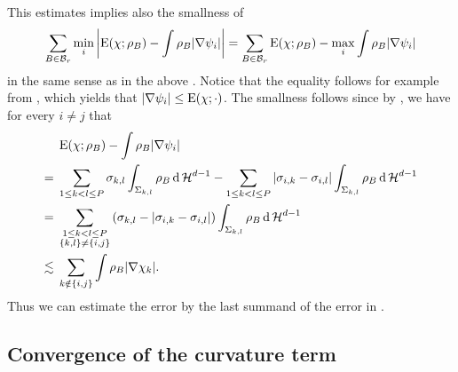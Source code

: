 \begin{remark}
	\label{localization_estimate_weaker}
This estimates implies also the smallness of
\begin{equation*}
	\sum_{ B \in \mathcal{ B }_{ r } }
		\min_{ i }
			\abs{
			\operatorname{E} ( \chi; \rho_{ B } )
			-
			\int
				\rho_{ B }
			\abs{ \nabla \psi_{ i } }
		}
	=
	\sum_{ B \in \mathcal{ B }_{ r } }
		\operatorname{E} ( \chi ; \rho_{ B } )
		-
		\max_{ i }
			\int
				\rho_{ B }
			\abs{ \nabla \psi_{ i } }
\end{equation*}
in the same sense as in the above . 
Notice that the equality follows for example from 
, which yields that $ \abs{ \nabla 
\psi_{ i } } \leq \operatorname{E} ( \chi ; \cdot )$. The smallness follows since by 
, we have for every $ i \neq j $ that
\begin{align*}
	&
	\operatorname{E} ( \chi ; \rho_{ B } ) 
	-
	\int
		\rho_{ B }
	\abs{ \nabla \psi_{ i } }
	\\
	={} &
	\sum_{ 1 \leq k < l \leq P }
		\sigma_{ k , l }
		\int_{ \Sigma_{ k , l } }
			\rho_{ B }
		\dd{ \operatorname{\mathcal{H}}^{ d -1 } }
	-
	\sum_{ 1 \leq k < l \leq P }
		\abs{ \sigma_{ i , k } - \sigma_{ i , l } }
		\int_{ \Sigma_{ k, l } }
			\rho_{ B }
		\dd{ \operatorname{\mathcal{H}}^{ d - 1 } }
	\\
	={} &
	\sum_{ \substack{1 \leq k < l \leq P \\ \{ k, l \} \neq \{ i, j \} } }
		\left(
			\sigma_{ k , l } - \abs{ \sigma_{ i , k } - \sigma_{ i , l } }
		\right)
		\int_{ \Sigma_{ k , l } }
			\rho_{ B }
		\dd{ \operatorname{\mathcal{H}}^{ d - 1 } }
	\\
	\lesssim{} &
	\sum_{ k \notin \{ i, j \} }
		\int
			\rho_{ B }
		\abs{ \nabla \chi_{ k } }.
\end{align*}
Thus we can estimate the error by the last summand of the error in 
.
\end{remark}
\subsection{Convergence of the curvature term}

